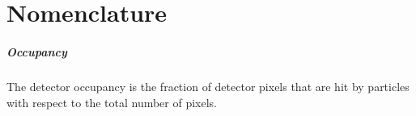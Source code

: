 \chapter*{Nomenclature} 
\paragraph{Occupancy}
The detector occupancy is the fraction of detector pixels that are hit by particles with respect to the total number of pixels.